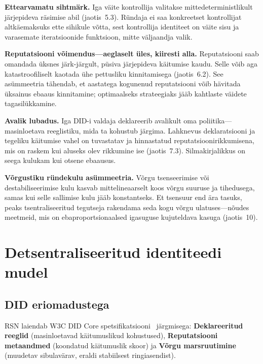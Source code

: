 \documentclass[11pt,a4paper,twocolumn]{article}
\begin{document}
\textbf{Ettearvamatu sihtmärk.} Iga väite kontrollija valitakse mittedeterministlikult järjepideva räsimise abil (jaotis~5.3). Ründaja ei saa konkreetset kontrollijat altkäemaksuks ette sihikule võtta, sest kontrollija identiteet on väite sisu ja varasemate iteratsioonide funktsioon, mitte väljaandja valik.

\textbf{Reputatsiooni võimendus---aeglaselt üles, kiiresti alla.} Reputatsiooni saab omandada üksnes järk-järgult, püsiva järjepideva käitumise kaudu. Selle võib aga katastroofiliselt kaotada ühe pettusliku kinnitamisega (jaotis~6.2). See asümmeetria tähendab, et aastatega kogunenud reputatsiooni võib hävitada üksainus ebaaus kinnitamine; optimaalseks strateegiaks jääb kahtlaste väidete tagasilükkamine.

\textbf{Avalik lubadus.} Iga DID-i valdaja deklareerib avalikult oma poliitika---masinloetava reeglistiku, mida ta kohustub järgima. Lahknevus deklaratsiooni ja tegeliku käitumise vahel on tuvastatav ja hinnastatud reputatsioonirikkumisena, mis on raskem kui aluseks olev rikkumine ise (jaotis~7.3). Silmakirjalikkus on seega kulukam kui otsene ebaausus.

\textbf{Võrgustiku ründekulu asümmeetria.} Võrgu tsenseerimise või destabiliseerimise kulu kasvab mittelineaarselt koos võrgu suuruse ja tihedusega, samas kui selle sallimise kulu jääb konstantseks. Et tsensuur end ära tasuks, peaks tsentraliseeritud tegutseja rakendama seda kogu võrgu ulatuses---nõudes meetmeid, mis on ebaproportsionaalsed igasuguse kujuteldava kasuga (jaotis~10).

\section{Detsentraliseeritud identiteedi mudel}

\subsection{DID eriomadustega}

RSN laiendab W3C DID Core spetsifikatsiooni~\cite{did2022} järgmisega: \textbf{Deklareeritud reeglid} (masinloetavad käitumuslikud kohustused), \textbf{Reputatsiooni metaandmed} (koondatud käitumuslik skoor) ja \textbf{Võrgu marsruutimine} (muudetav sibulavärav, eraldi stabiilsest ringiasendist).
\end{document}
